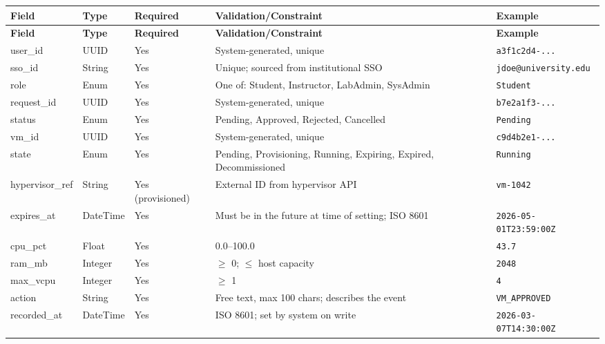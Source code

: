 \documentclass[12pt,letterpaper]{article}
\newcommand{\code}[1]{\texttt{\color{codegray}#1}}
\begin{document}
\begin{longtable}{L{2.8cm} L{1.8cm} C{1.6cm} L{4cm} L{2.8cm}}
  \toprule
  \textbf{Field} & \textbf{Type} & \textbf{Required} & \textbf{Validation/Constraint} & \textbf{Example} \\
  \midrule
  \endfirsthead
  \toprule
  \textbf{Field} & \textbf{Type} & \textbf{Required} & \textbf{Validation/Constraint} & \textbf{Example} \\
  \midrule
  \endhead
  \bottomrule
  \endfoot

  user\_id       & UUID     & Yes              & System-generated, unique                                          & \code{a3f1c2d4-...} \\
  sso\_id        & String   & Yes              & Unique; sourced from institutional SSO                            & \code{jdoe@university.edu} \\
  role           & Enum     & Yes              & One of: Student, Instructor, LabAdmin, SysAdmin                   & \code{Student} \\
  request\_id    & UUID     & Yes              & System-generated, unique                                          & \code{b7e2a1f3-...} \\
  status         & Enum     & Yes              & Pending, Approved, Rejected, Cancelled                            & \code{Pending} \\
  vm\_id         & UUID     & Yes              & System-generated, unique                                          & \code{c9d4b2e1-...} \\
  state          & Enum     & Yes              & Pending, Provisioning, Running, Expiring, Expired, Decommissioned & \code{Running} \\
  hypervisor\_ref & String  & Yes (provisioned)& External ID from hypervisor API                                   & \code{vm-1042} \\
  expires\_at    & DateTime & Yes              & Must be in the future at time of setting; ISO 8601                & \code{2026-05-01T23:59:00Z} \\
  cpu\_pct       & Float    & Yes              & 0.0--100.0                                                        & \code{43.7} \\
  ram\_mb        & Integer  & Yes              & $\geq$ 0; $\leq$ host capacity                                    & \code{2048} \\
  max\_vcpu      & Integer  & Yes              & $\geq$ 1                                                          & \code{4} \\
  action         & String   & Yes              & Free text, max 100 chars; describes the event                     & \code{VM\_APPROVED} \\
  recorded\_at   & DateTime & Yes              & ISO 8601; set by system on write                                   & \code{2026-03-07T14:30:00Z} \\
\end{longtable}
\end{document}
